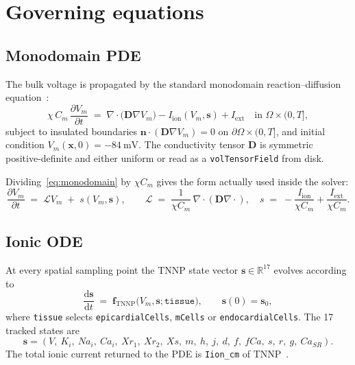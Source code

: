 \documentclass[11pt,a4paper]{article}
\newcommand{\Vm}{V_{m}}
\newcommand{\Iion}{I_{\text{ion}}}
\newcommand{\Iext}{I_{\text{ext}}}
\newcommand{\Dten}{\mathbf{D}}
\newcommand{\grad}{\nabla}
\newcommand{\divg}{\nabla\!\cdot}
\newcommand{\code}[1]{\texttt{\small #1}}
\begin{document}
\section{Governing equations}

\subsection{Monodomain PDE}

The bulk voltage is propagated by the standard monodomain
reaction--diffusion equation~\cite{ttp2004,niederer2012}:
\begin{equation}
  \chi \, C_{m} \, \frac{\partial \Vm}{\partial t}
   \;=\;
   \divg\!\bigl( \Dten \grad \Vm \bigr)
   - \Iion(\Vm, \mathbf{s})
   + \Iext
   \quad \text{in } \Omega \times (0, T],
   \label{eq:monodomain}
\end{equation}
subject to insulated boundaries
$\mathbf{n} \cdot ( \Dten \grad \Vm ) = 0$ on
$\partial \Omega \times (0, T]$, and initial condition
$\Vm(\mathbf{x}, 0) = -\SI{84}{\milli\volt}$. The conductivity tensor
$\Dten$ is symmetric positive-definite and either uniform or read as a
\code{volTensorField} from disk.

Dividing~\eqref{eq:monodomain} by $\chi C_{m}$ gives the form actually
used inside the solver:
\begin{equation}
  \frac{\partial \Vm}{\partial t}
   \;=\;
   \mathcal{L} \Vm
   \;+\;
   s(\Vm, \mathbf{s}),
   \qquad
   \mathcal{L} \;=\; \frac{1}{\chi C_{m}}\,\divg(\Dten \grad \cdot),
   \quad
   s \;=\; -\frac{\Iion}{\chi C_{m}} + \frac{\Iext}{\chi C_{m}}.
   \label{eq:semi-discrete}
\end{equation}

\subsection{Ionic ODE}

At every spatial sampling point the TNNP state vector
$\mathbf{s} \in \mathbb{R}^{17}$ evolves according to
\begin{equation}
  \frac{\mathrm{d}\mathbf{s}}{\mathrm{d}t}
   \;=\;
   \mathbf{f}_{\text{TNNP}}\!\bigl(\Vm, \mathbf{s}; \texttt{tissue}\bigr),
   \qquad \mathbf{s}(0) = \mathbf{s}_{0},
   \label{eq:tnnp}
\end{equation}
where \code{tissue} selects \code{epicardialCells}, \code{mCells} or
\code{endocardialCells}. The 17 tracked states are
\[
  \mathbf{s} = (V,\ K_{i},\ Na_{i},\ Ca_{i},\ Xr_{1},\ Xr_{2},\ Xs,\ m,\ h,\ j,\ d,\ f,\ fCa,\ s,\ r,\ g,\ Ca_{SR}).
\]
The total ionic current returned to the PDE is \code{Iion\_cm} of
TNNP~\cite{ttp2004}.
\end{document}
